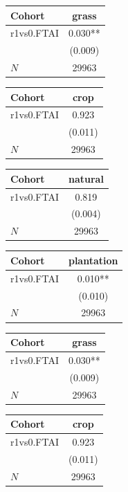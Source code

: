 {
\def\sym#1{\ifmmode^{#1}\else\(^{#1}\)\fi}
\begin{tabular}{l*{1}{c}}
\toprule
Cohort    &    grass   \\
\midrule
r1vs0.FTAI&    0.030** \\
          &  (0.009)   \\
\midrule
\(N\)     &    29963   \\
\bottomrule
\end{tabular}
}
{
\def\sym#1{\ifmmode^{#1}\else\(^{#1}\)\fi}
\begin{tabular}{l*{1}{c}}
\toprule
Cohort    &     crop   \\
\midrule
r1vs0.FTAI&    0.923   \\
          &  (0.011)   \\
\midrule
\(N\)     &    29963   \\
\bottomrule
\end{tabular}
}
{
\def\sym#1{\ifmmode^{#1}\else\(^{#1}\)\fi}
\begin{tabular}{l*{1}{c}}
\toprule
Cohort    &  natural   \\
\midrule
r1vs0.FTAI&    0.819   \\
          &  (0.004)   \\
\midrule
\(N\)     &    29963   \\
\bottomrule
\end{tabular}
}
{
\def\sym#1{\ifmmode^{#1}\else\(^{#1}\)\fi}
\begin{tabular}{l*{1}{c}}
\toprule
Cohort    &plantation   \\
\midrule
r1vs0.FTAI&    0.010** \\
          &  (0.010)   \\
\midrule
\(N\)     &    29963   \\
\bottomrule
\end{tabular}
}
{
\def\sym#1{\ifmmode^{#1}\else\(^{#1}\)\fi}
\begin{tabular}{l*{1}{c}}
\toprule
Cohort    &    grass   \\
\midrule
r1vs0.FTAI&    0.030** \\
          &  (0.009)   \\
\midrule
\(N\)     &    29963   \\
\bottomrule
\end{tabular}
}
{
\def\sym#1{\ifmmode^{#1}\else\(^{#1}\)\fi}
\begin{tabular}{l*{1}{c}}
\toprule
Cohort    &     crop   \\
\midrule
r1vs0.FTAI&    0.923   \\
          &  (0.011)   \\
\midrule
\(N\)     &    29963   \\
\bottomrule
\end{tabular}
}
